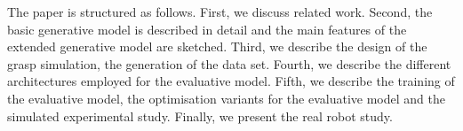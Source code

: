 
The paper is structured as follows. First, we discuss related work. Second, the basic generative model is described in detail and the main features of the extended generative model are sketched. Third, we describe the design of the grasp simulation, the generation of the data set. Fourth, we describe the different architectures employed for the evaluative model. Fifth, we describe the training of the evaluative model, the optimisation variants for the evaluative model and the simulated experimental study. Finally, we present the real robot study.
